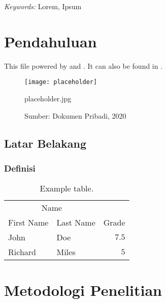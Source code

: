 \documentclass[11pt]{simart} %
\begin{document}
\hspace*{3.6mm}\textit{Keywords:} Lorem, Ipsum %

\vspace{30pt} %

\section{Pendahuluan}

This file powered by \citep{einstein} and \citep{latexcompanion}. It can also be found in \cite{knuthwebsite}.

\begin{figure}[htpb]
	\centering
	\texttt{[image: placeholder]}
	\caption{placeholder.jpg}
	\caption*{Sumber: Dokumen Pribadi, 2020}
	\label{fig:placeholder-jpg}
\end{figure}
\lipsum[1-3]

\subsection{Latar Belakang}

\lipsum[4-5]


\subsubsection{Definisi}

\lipsum[6-7]
\begin{table}[h] %
	\caption{Example table.}
	\centering
	\begin{tabular}{l l r}
		\toprule
		\multicolumn{2}{c}{Name} \\
		\cmidrule(r){1-2}
		First Name & Last Name & Grade \\
		\midrule
		John & Doe & $7.5$ \\
		Richard & Miles & $5$ \\
		\bottomrule
	\end{tabular}
\end{table}





\section{Metodologi Penelitian}
\end{document}
